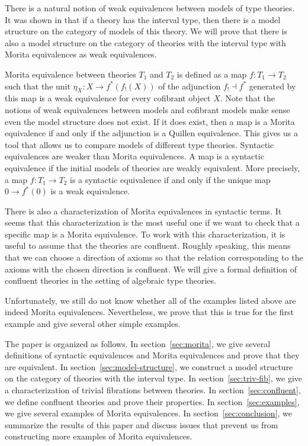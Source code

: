 \documentclass[reqno]{amsart}
\theoremstyle{definition}
\theoremstyle{remark}
\numberwithin{figure}{section}
\begin{document}
There is a natural notion of weak equivalences between models of type theories.
It was shown in \cite{alg-models} that if a theory has the interval type, then there is a model structure on the category of models of this theory.
We will prove that there is also a model structure on the category of theories with the interval type with Morita equivalences as weak equivalences.

Morita equivalence between theories $T_1$ and $T_2$ is defined as a map $f : T_1 \to T_2$ such that the unit $\eta_X : X \to f^*(f_!(X))$ of the adjunction $f_! \dashv f^*$ generated by this map is a weak equivalence for every cofibrant object $X$.
Note that the notions of weak equivalences between models and cofibrant models make sense even the model structure does not exist.
If it does exist, then a map is a Morita equivalence if and only if the adjunction is a Quillen equivalence.
This gives us a tool that allows us to compare models of different type theories.
Syntactic equivalences are weaker than Morita equivalences.
A map is a syntactic equivalence if the initial models of theories are weakly equivalent.
More precisely, a map $f : T_1 \to T_2$ is a syntactic equivalence if and only if the unique map $0 \to f^*(0)$ is a weak equivalence.

There is also a characterization of Morita equivalences in syntactic terms.
It seems that this characterization is the most useful one if we want to check that a specific map is a Morita equivalence.
To work with this characterization, it is useful to assume that the theories are confluent.
Roughly speaking, this means that we can choose a direction of axioms so that the relation corresponding to the axioms with the chosen direction is confluent.
We will give a formal definition of confluent theories in the setting of algebraic type theories.

Unfortunately, we still do not know whether all of the examples listed above are indeed Morita equivalences.
Nevertheless, we prove that this is true for the first example and give several other simple examples.

The paper is organized as follows.
In section~\ref{sec:morita}, we give several definitions of syntactic equivalences and Morita equivalences and prove that they are equivalent.
In section~\ref{sec:model-structure}, we construct a model structure on the category of theories with the interval type.
In section~\ref{sec:triv-fib}, we give a characterization of trivial fibrations between theories.
In section~\ref{sec:confluent}, we define confluent theories and prove their properties.
In section~\ref{sec:examples}, we give several examples of Morita equivalences.
In section~\ref{sec:conclusion}, we summarize the results of this paper and discuss issues that prevent us from constructing more examples of Morita equivalences.
\end{document}
